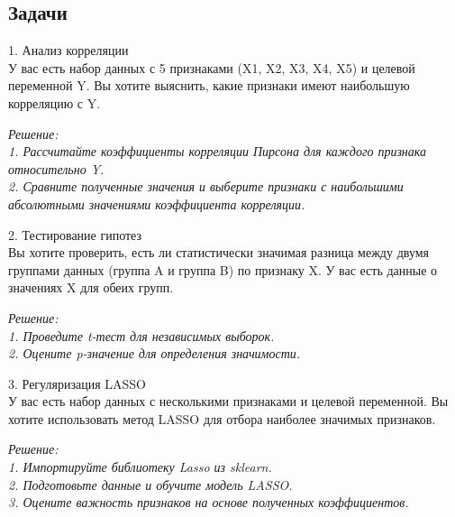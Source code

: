 \subsection{Задачи}

1. Анализ корреляции\\
У вас есть набор данных с 5 признаками (X1, X2, X3, X4, X5) и целевой переменной Y. Вы хотите выяснить, какие признаки имеют наибольшую корреляцию с Y.

\textit{Решение:\\
1. Рассчитайте коэффициенты корреляции Пирсона для каждого признака относительно Y.\\
2. Сравните полученные значения и выберите признаки с наибольшими абсолютными значениями коэффициента корреляции.}
   
2. Тестирование гипотез\\
Вы хотите проверить, есть ли статистически значимая разница между двумя группами данных (группа A и группа B) по признаку X. У вас есть данные о значениях X для обеих групп.

\textit{Решение:\\
1. Проведите t-тест для независимых выборок.\\
2. Оцените p-значение для определения значимости.}

3. Регуляризация LASSO \\
У вас есть набор данных с несколькими признаками и целевой переменной. Вы хотите использовать метод LASSO для отбора наиболее значимых признаков.

\textit{Решение:\\
1. Импортируйте библиотеку Lasso из sklearn.\\
2. Подготовьте данные и обучите модель LASSO.\\
3. Оцените важность признаков на основе полученных коэффициентов.\\}

